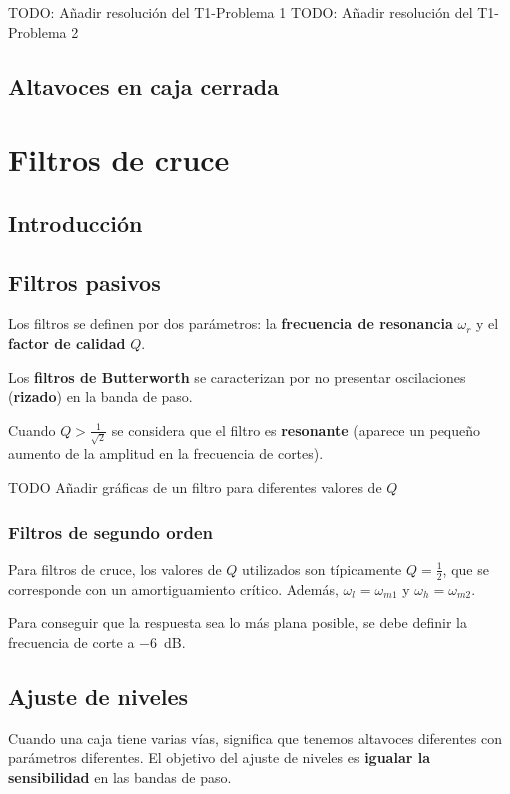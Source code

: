 \documentclass[12pt, a4paper]{article}
\begin{document}
TODO: Añadir resolución del T1-Problema 1
TODO: Añadir resolución del T1-Problema 2

\subsection{Altavoces en caja cerrada}

\newpage
\section{Filtros de cruce}

\subsection{Introducción}

\subsection{Filtros pasivos}

Los filtros se definen por dos parámetros: la \textbf{frecuencia de resonancia} $\omega _r$ y el \textbf{factor de calidad} $Q$.

Los \textbf{filtros de Butterworth} se caracterizan por no presentar oscilaciones (\textbf{rizado}) en la banda de paso.

Cuando $Q>\frac{1}{\sqrt{2}}$ se considera que el filtro es \textbf{resonante} (aparece un pequeño aumento de la amplitud en la frecuencia de cortes).

TODO Añadir gráficas de un filtro para diferentes valores de $Q$


\subsubsection{Filtros de segundo orden}

Para filtros de cruce, los valores de $Q$ utilizados son típicamente $Q=\frac{1}{2}$, que se corresponde con un amortiguamiento crítico. Además, $\omega_l = \omega_{m1}$ y $\omega_h = \omega_{m2}$.

Para conseguir que la respuesta sea lo más plana posible, se debe definir la frecuencia de corte a \qty{-6}{\dB}.

\subsection{Ajuste de niveles}

Cuando una caja tiene varias vías, significa que tenemos altavoces diferentes con parámetros diferentes. El objetivo del ajuste de niveles es \textbf{igualar la sensibilidad} en las bandas de paso.
\end{document}
